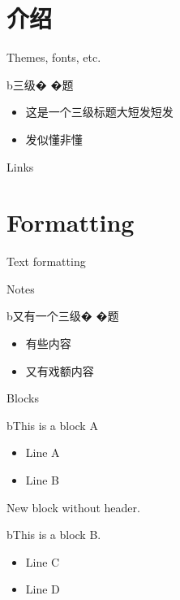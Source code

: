 \section{介绍}\label{ux4ecbux7ecd}

\begin{frame}{Themes, fonts, etc.}
\label{themes-fonts-etc.}
\begin{block}{b三级� �题 }
\label{bux4e09ux7ea7ux6807ux9898-beamer}
\begin{itemize}
\tightlist
\item
  这是一个三级标题大短发短发
\item
  发似懂非懂
\end{itemize}
\end{block}
\end{frame}

\begin{frame}{Links}
\label{links}
\end{frame}

\section{Formatting}\label{formatting}

\begin{frame}{Text formatting}
\label{text-formatting}
\end{frame}

\begin{frame}{Notes}
\label{notes}
\begin{block}{b又有一个三级� �题 }
\label{bux53c8ux6709ux4e00ux4e2aux4e09ux7ea7ux6807ux9898-beamer}
\begin{itemize}
\tightlist
\item
  有些内容
\item
  又有戏额内容
\end{itemize}
\end{block}
\end{frame}

\begin{frame}{Blocks}
\label{blocks}
\begin{block}{bThis is a block A }
\label{bthis-is-a-block-a-beamer}
\begin{itemize}
\tightlist
\item
  Line A
\item
  Line B
\end{itemize}

New block without header.
\end{block}

\begin{block}{bThis is a block B. }
\label{bthis-is-a-block-b.-beamer}
\begin{itemize}
\tightlist
\item
  Line C
\item
  Line D
\end{itemize}
\end{block}
\end{frame}

